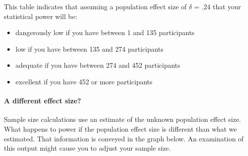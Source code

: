 \documentclass[
]{krantz}
\begin{document}
This table indicates that assuming a population effect size of \(\delta\) = .24 that your statistical power will be:

\begin{itemize}
\item
  dangerously low if you have between 1 and 135 participants
\item
  low if you have between 135 and 274 participants
\item
  adequate if you have between 274 and 452 participants
\item
  excellent if you have 452 or more participants
\end{itemize}

\hypertarget{a-different-effect-size-1}{%
\paragraph{A different effect size?}\label{a-different-effect-size-1}}

Sample size calculations use an estimate of the unknown population effect size. What happens to power if the population effect size is different than what we estimated. That information is conveyed in the graph below. An examination of this output might cause you to adjust your sample size.
\end{document}
